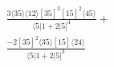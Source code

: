 \documentclass[varwidth, border=5pt]{standalone}
\begin{document}
\begin{my}
$\begin{gathered}
\scriptscriptstyle\frac{3⟨35⟩⟨12⟩[35]^2[15]^2⟨45⟩}{⟨5|1+2|5]^4}+\\
\scriptscriptstyle\frac{-2[35]^2⟨35⟩[15]⟨24⟩}{⟨5|1+2|5]^3}\phantom{+}
\end{gathered}$
\end{my}
\end{document}
